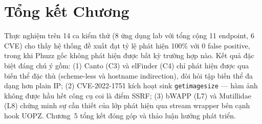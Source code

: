 \section{Tổng kết Chương}

Thực nghiệm trên 14 ca kiểm thử (8 ứng dụng lab với tổng cộng 11
endpoint, 6 CVE) cho thấy hệ thống đề xuất đạt tỷ lệ phát hiện 100\%
với 0 false positive, trong khi Phuzz gốc không phát hiện được bất kỳ
trường hợp nào. Kết quả đặc biệt đáng chú ý gồm: (1) Canto (C3) và
elFinder (C4) chỉ phát hiện được qua biến thể đặc thù (scheme-less và
hostname indirection), đòi hỏi tập biến thể đa dạng hơn plain IP; (2)
CVE-2022-1751 kích hoạt sink \texttt{getimagesize} --- hàm ảnh không
được hầu hết công cụ coi là điểm SSRF; (3) bWAPP (L7) và Mutillidae
(L8) chứng minh sự cần thiết của lớp phát hiện qua stream wrapper bên
cạnh hook UOPZ. Chương~5 tổng kết đóng góp và thảo luận hướng phát
triển.
